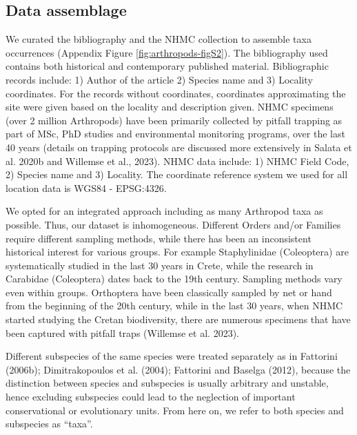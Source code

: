     \subsection{Data assemblage}
    \label{subsec:arthropods-data-assemblage}

We curated the bibliography and the NHMC collection to assemble taxa
occurrences (Appendix Figure \ref{fig:arthropods-figS2}). The bibliography used
contains both historical and contemporary published material. Bibliographic
records include: 1) Author of the article 2) Species name and 3) Locality coordinates.
For the records without coordinates, coordinates approximating the site were
given based on the locality and description given. NHMC specimens (over 2
million Arthropods) have been primarily collected by pitfall trapping as part
of MSc, PhD studies and environmental monitoring programs, over the last 40
years (details on trapping protocols are discussed more extensively in Salata et al. 2020b and Willemse et al., 2023).
NHMC data include: 1) NHMC Field Code, 2) Species name and 3) Locality.
The coordinate reference system we used for all location data is WGS84 - EPSG:4326.

We opted for an integrated approach including as many Arthropod taxa as
possible. Thus, our dataset is inhomogeneous. Different Orders and/or Families
require different sampling methods, while there has been an inconsistent
historical interest for various groups. For example Staphylinidae (Coleoptera)
are systematically studied in the last 30 years in Crete, while the research in
Carabidae (Coleoptera) dates back to the 19th century. Sampling methods vary
even within groups. Orthoptera have been classically sampled by net or hand
from the beginning of the 20th century, while in the last 30 years, when NHMC
started studying the Cretan biodiversity, there are numerous specimens that
have been captured with pitfall traps (Willemse et al. 2023).

Different subspecies of the same species were treated separately as in Fattorini (2006b); Dimitrakopoulos et al. (2004); Fattorini and Baselga (2012),
because the distinction between species and subspecies is usually arbitrary and
unstable, hence excluding subspecies could lead to the neglection of important
conservational or evolutionary units. From here on, we refer to both species
and subspecies as “taxa”.
    

